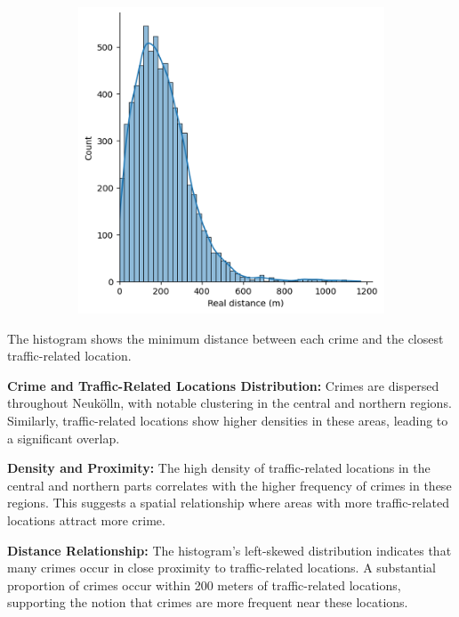 \begin{figure}[h]
\begin{subfigure}[b]{0.45\textwidth}
        \includegraphics[width=\textwidth]{./figures/Gerard/traffic_1.png}
        \caption{}
        \label{fig:image2}
    \end{subfigure}

\end{figure}

The histogram shows the minimum distance between each crime and the closest traffic-related location. 

\textbf{Crime and Traffic-Related Locations Distribution:} Crimes are dispersed throughout Neukölln, with notable clustering in the central and northern regions. Similarly, traffic-related locations show higher densities in these areas, leading to a significant overlap. 

\textbf{Density and Proximity:} The high density of traffic-related locations in the central and northern parts correlates with the higher frequency of crimes in these regions. This suggests a spatial relationship where areas with more traffic-related locations attract more crime. 

\textbf{Distance Relationship:} The histogram's left-skewed distribution indicates that many crimes occur in close proximity to traffic-related locations. A substantial proportion of crimes occur within 200 meters of traffic-related locations, supporting the notion that crimes are more frequent near these locations. 

